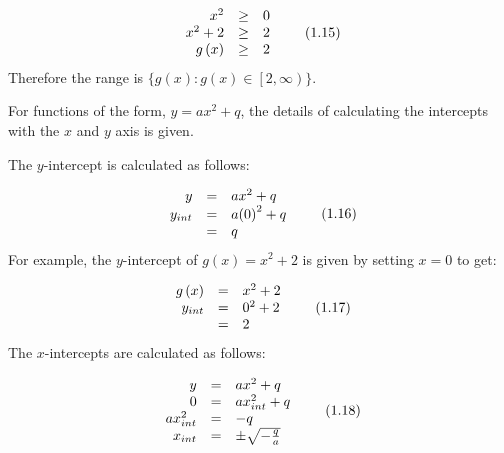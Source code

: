 \label{m39345*id242733}\nopagebreak\noindent{}
\begin{equation}
\begin{array}{ccc}\hfill {x}^{2}& \ge & 0\hfill \\ \hfill {x}^{2}+2& \ge & 2\hfill \\ \hfill g\left(x\right)& \ge & 2\hfill \end{array}\tag{1.15}
\end{equation}
\label{m39345*id242814}Therefore the range is $\{g\left(x\right):g\left(x\right)\in \left[2,\infty \right)\}$.\par 
\label{m39345*uid118}
\nopagebreak
\label{m39345*id242875}For functions of the form, $y=a{x}^{2}+q$, the details of calculating the intercepts with the $x$ and $y$ axis is given.\par 
\label{m39345*id242926}The $y$-intercept is calculated as follows:\par 
\label{m39345*uid119}\nopagebreak\noindent{}
\begin{equation}
\begin{array}{ccc}\hfill y& =& a{x}^{2}+q\hfill \\ \hfill {y}_{int}& =& a{\left(0\right)}^{2}+q\hfill \\ & =& q\hfill \end{array}\tag{1.16}
\end{equation}
\label{m39345*id243039}For example, the $y$-intercept of $g\left(x\right)={x}^{2}+2$ is given by setting $x=0$ to get:\par 
\label{m39345*id243099}\nopagebreak\noindent{}
\begin{equation}
\begin{array}{ccc}\hfill g\left(x\right)& =& {x}^{2}+2\hfill \\ \hfill {y}_{int}& =& {0}^{2}+2\hfill \\ & =& 2\hfill \end{array}\tag{1.17}
\end{equation}
\label{m39345*id243191}The $x$-intercepts are calculated as follows:\par 
\label{m39345*uid120}\nopagebreak\noindent{}
\begin{equation}
\begin{array}{ccc}\hfill y& =& a{x}^{2}+q\hfill \\ \hfill 0& =& ax_{int}^{2}+q\hfill \\ \hfill ax_{int}^{2}& =& -q\hfill \\ \hfill {x}_{int}& =& \ensuremath{\pm}\sqrt{-\frac{q}{a}}\hfill \end{array}\tag{1.18}
\end{equation}
